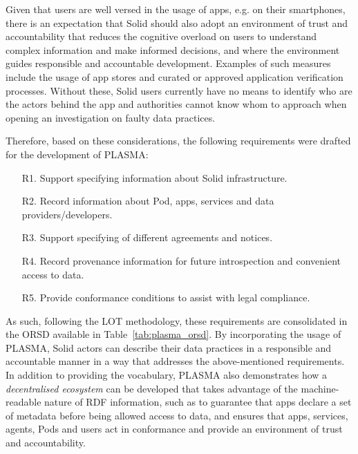 Given that users are well versed in the usage of apps, e.g. on their smartphones, there is an expectation that Solid should also adopt an environment of trust and accountability that reduces the cognitive overload on users to understand complex information and make informed decisions, and where the environment guides responsible and accountable development.
Examples of such measures include the usage of app stores and curated or approved application verification processes.
Without these, Solid users currently have no means to identify who are the actors behind the app and authorities cannot know whom to approach when opening an investigation on faulty data practices.

Therefore, based on these considerations, the following requirements were drafted for the development of PLASMA:

\begin{enumerate}
    \item [R1.] Support specifying information about Solid infrastructure.
    \item [R2.] Record information about Pod, apps, services and data providers/developers.
    \item [R3.] Support specifying of different agreements and notices.
    \item [R4.] Record provenance information for future introspection and convenient access to data.
    \item [R5.] Provide conformance conditions to assist with legal compliance.
\end{enumerate}

As such, following the LOT methodology, these requirements are consolidated in the ORSD available in Table~\ref{tab:plasma_orsd}.
By incorporating the usage of PLASMA, Solid actors can describe their data practices in a responsible and accountable manner in a way that addresses the above-mentioned requirements.
In addition to providing the vocabulary, PLASMA also demonstrates how a \textit{decentralised ecosystem} can be developed that takes advantage of the machine-readable nature of RDF information, such as to guarantee that apps declare a set of metadata before being allowed access to data, and ensures that apps, services, agents, Pods and users act in conformance and provide an environment of trust and accountability.

